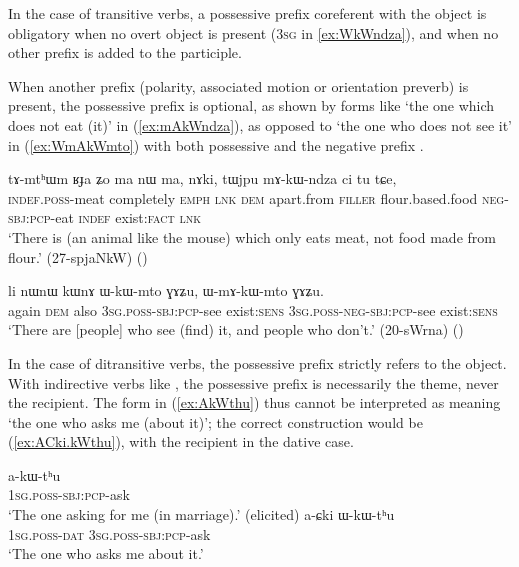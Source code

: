 In the case of transitive verbs, a possessive prefix coreferent with the object is obligatory when no overt object is present (\textsc{3sg}  in \ref{ex:WkWndza}), and when no other prefix is added to the participle.

When another prefix (polarity, associated motion or orientation preverb) is present, the possessive prefix is optional, as shown by forms like  `the one which does not eat (it)' in (\ref{ex:mAkWndza}), as opposed to  `the one who does not see it' in (\ref{ex:WmAkWmto}) with both possessive  and the negative prefix .

 \begin{exe} 
\ex \label{ex:mAkWndza}
\gll  tɤ-mtʰɯm ʁɟa ʑo ma nɯ ma, nɤki, tɯjpu mɤ-kɯ-ndza ci tu tɕe, \\
\textsc{indef}.\textsc{poss}-meat completely \textsc{emph} \textsc{lnk} \textsc{dem} apart.from \textsc{filler} flour.based.food \textsc{neg}-\textsc{sbj}:\textsc{pcp}-eat \textsc{indef} exist:\textsc{fact} \textsc{lnk} \\
\glt  `There is (an animal like the mouse) which only eats meat, not food made from flour.' (27-spjaNkW)
()
\end{exe}

 \begin{exe} 
\ex \label{ex:WmAkWmto} 
\gll  li nɯnɯ kɯnɤ ɯ-kɯ-mto ɣɤʑu, ɯ-mɤ-kɯ-mto ɣɤʑu. \\
again \textsc{dem} also \textsc{3sg}.\textsc{poss}-\textsc{sbj}:\textsc{pcp}-see exist:\textsc{sens} \textsc{3sg}.\textsc{poss}-\textsc{neg}-\textsc{sbj}:\textsc{pcp}-see exist:\textsc{sens} \\
\glt `There are [people] who see (find) it, and people who don't.' (20-sWrna)
()
\end{exe}

In the case of ditransitive verbs, the possessive prefix strictly refers to the object. With indirective verbs like , the possessive prefix is necessarily the theme, never the recipient. The form in (\ref{ex:AkWthu}) thus cannot be interpreted as meaning `the one who asks me (about it)'; the correct construction would be (\ref{ex:ACki.kWthu}), with the recipient in the dative case.

\begin{exe}
\ex \label{ex:AkWthu}
\gll a-kɯ-tʰu  \\
\textsc{1sg}.\textsc{poss}-\textsc{sbj}:\textsc{pcp}-ask \\
\glt `The one asking for me (in marriage).' (elicited)
\ex \label{ex:ACki.kWthu}
\gll a-ɕki ɯ-kɯ-tʰu  \\
\textsc{1sg}.\textsc{poss}-\textsc{dat} \textsc{3sg}.\textsc{poss}-\textsc{sbj}:\textsc{pcp}-ask \\ 
\glt `The one who asks me about it.' 
\end{exe}

